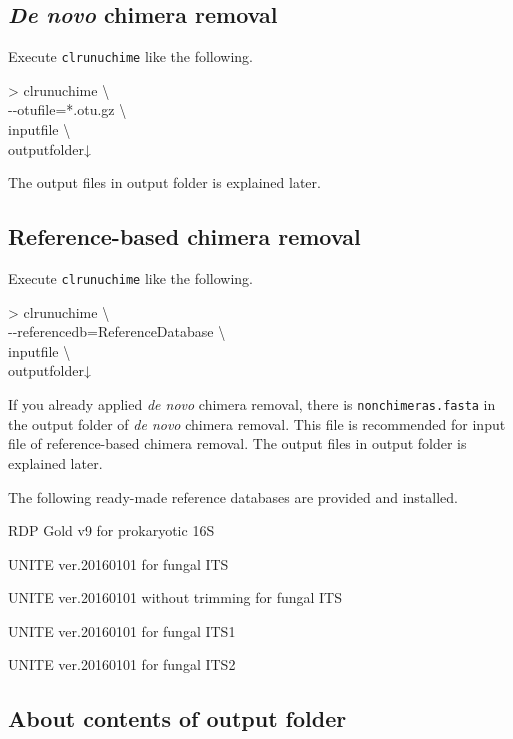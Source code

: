 \documentclass[titlepage,10pt,a4paper,english]{jsbook}
\newenvironment{cmd}{\begin{oframed}\raggedright\ttfamily\footnotesize\setlength{\baselineskip}{1.4em}}{\end{oframed}\vspace{-1em}}
\begin{document}
\subsection{\textit{De novo} chimera removal}

Execute \texttt{clrunuchime} like the following.
\begin{cmd}
{\textgreater} clrunuchime {\textbackslash}\\
{-}{-}otufile=*.otu.gz {\textbackslash}\\
inputfile {\textbackslash}\\
outputfolder↓
\end{cmd}
The output files in output folder is explained later.

\subsection{Reference-based chimera removal}

Execute \texttt{clrunuchime} like the following.
\begin{cmd}
{\textgreater} clrunuchime {\textbackslash}\\
{-}{-}referencedb=ReferenceDatabase {\textbackslash}\\
inputfile {\textbackslash}\\
outputfolder↓
\end{cmd}
If you already applied \textit{de novo} chimera removal, there is \texttt{nonchimeras.fasta} in the output folder of \textit{de novo} chimera removal.
This file is recommended for input file of reference-based chimera removal.
The output files in output folder is explained later.

The following ready-made reference databases are provided and installed.
\begin{description}\small\setlength{\baselineskip}{1.1em}
\item[rdpgoldv9] RDP Gold v9 for prokaryotic 16S
\item[unite20160101] UNITE ver.20160101 for fungal ITS
\item[unite20160101untrim] UNITE ver.20160101 without trimming for fungal ITS
\item[unite20160101its1] UNITE ver.20160101 for fungal ITS1
\item[unite20160101its2] UNITE ver.20160101 for fungal ITS2
\end{description}

\subsection{About contents of output folder}
\end{document}
